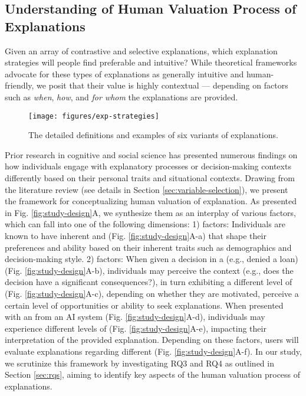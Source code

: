 \subsection{Understanding of Human Valuation Process of Explanations} 
Given an array of contrastive and selective explanations, which explanation strategies will people find preferable and intuitive? While theoretical frameworks advocate for these types of explanations as generally intuitive and human-friendly, we posit that their value is highly contextual — depending on factors such as \textit{when}, \textit{how}, and \textit{for whom} the explanations are provided.

\begin{figure*}[h]%
\centering
\texttt{[image: figures/exp-strategies]}
\vspace{-2em}
\caption{The detailed definitions and examples of six variants of explanations.}\label{fig:exp-strategies}
\end{figure*}

Prior research in cognitive and social science has presented numerous findings on how individuals engage with explanatory processes or decision-making contexts differently based on their personal traits and situational contexts. Drawing from the literature review (see details in Section \ref{sec:variable-selection}), we present the framework for conceptualizing human valuation of explanation. As presented in Fig. \ref{fig:study-design}A, we synthesize them as an interplay of various factors, which can fall into one of the following dimensions: 1)  factors: Individuals are known to have inherent  and  (Fig. \ref{fig:study-design}A-a) that shape their preferences and ability based on their inherent traits such as demographics and decision-making style. 2)  factors: When given a decision in a  (e.g., denied a loan) (Fig. \ref{fig:study-design}A-b), individuals may perceive the context (e.g., does the decision have a significant consequences?), in turn exhibiting a different level of  (Fig. \ref{fig:study-design}A-c), depending on whether they are motivated, perceive a certain level of opportunities or ability to seek explanations. When presented with an  from an AI system (Fig. \ref{fig:study-design}A-d), individuals may experience different levels of  (Fig. \ref{fig:study-design}A-e), impacting their interpretation of the provided explanation. Depending on these factors, users will evaluate explanations regarding different  (Fig. \ref{fig:study-design}A-f). In our study, we scrutinize this framework by investigating RQ3 and RQ4 as outlined in Section \ref{sec:rqs}, aiming to identify key aspects of the human valuation process of explanations.


